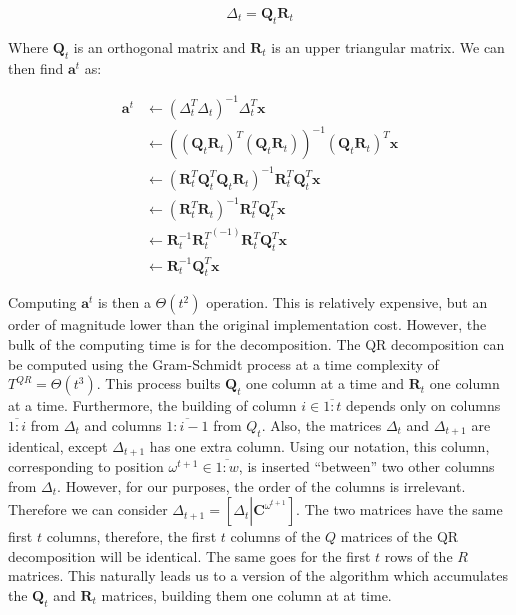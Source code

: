 \documentclass[12pt,a4paper,oneside,english]{UPBThesis}
\newcommand{\hcrange}[2]{\overline{{#1}\colon\!\!{#2}}}
\begin{document}
\begin{equation}
\Delta_t = \textbf{Q}_t\textbf{R}_t
\end{equation}

Where $\textbf{Q}_t$ is an orthogonal matrix and $\textbf{R}_t$ is an upper triangular matrix. We can then find $\textbf{a}^t$ as:

\begin{align*}
\textbf{a}^t & \gets (\Delta_t^T\Delta_t)^{-1}\Delta_t^T\textbf{x} \\
             & \gets ((\textbf{Q}_t\textbf{R}_t)^T(\textbf{Q}_t\textbf{R}_t))^{-1}(\textbf{Q}_t\textbf{R}_t)^T\textbf{x} \\
             & \gets (\textbf{R}_t^T\textbf{Q}_t^T\textbf{Q}_t\textbf{R}_t)^{-1}\textbf{R}_t^T\textbf{Q}_t^T\textbf{x} \\
             & \gets (\textbf{R}_t^T\textbf{R}_t)^{-1}\textbf{R}_t^T\textbf{Q}_t^T\textbf{x} \\
             & \gets \textbf{R}_t^{-1}{\textbf{R}_t^T}^{(-1)}\textbf{R}_t^T\textbf{Q}_t^T\textbf{x} \\
             & \gets \textbf{R}_t^{-1}\textbf{Q}_t^T\textbf{x}
\end{align*}

Computing $\textbf{a}^t$ is then a $\Theta(t^2)$ operation. This is relatively expensive, but an order of magnitude lower than the original implementation cost. However, the bulk of the computing time is for the decomposition. The QR decomposition can be computed using the Gram-Schmidt process at a time complexity of $T^{QR} = \Theta(t^3)$. This process builts $\textbf{Q}_t$ one column at a time and $\textbf{R}_t$ one column at a time. Furthermore, the building of column $i \in \hcrange{1}{t}$ depends only on columns $\hcrange{1}{i}$ from $\Delta_t$ and columns $\hcrange{1}{i-1}$ from $Q_t$. Also, the matrices $\Delta_t$ and $\Delta_{t+1}$ are identical, except $\Delta_{t+1}$ has one extra column. Using our notation, this column, corresponding to position $\omega^{t+1} \in \hcrange{1}{w}$, is inserted ``between'' two other columns from $\Delta_t$. However, for our purposes, the order of the columns is irrelevant. Therefore we can consider $\Delta_{t+1} = \left[\Delta_t \left|\right. \textbf{C}^{\omega^{t+1}} \right]$. The two matrices have the same first $t$ columns, therefore, the first $t$ columns of the $Q$ matrices of the QR decomposition will be identical. The same goes for the first $t$ rows of the $R$ matrices. This naturally leads us to a version of the algorithm which accumulates the $\textbf{Q}_t$ and $\textbf{R}_t$ matrices, building them one column at at time.
\end{document}
